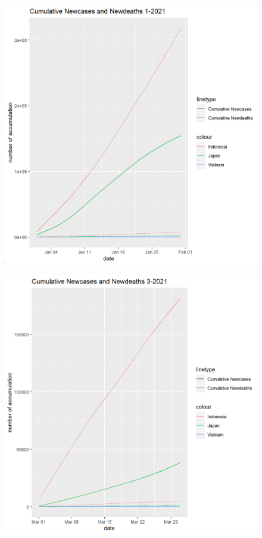 \documentclass[a4paper]{article}
\theoremstyle{definition}
\begin{document}
\begin{enumerate}[1)]
\begin{figure}[H]
\begin{center}
        \includegraphics[scale=0.4]{vi/cml_new_1_2021.png}
    \end{center}
    \end{figure}
    \begin{figure}[H]
    \begin{center}
        \includegraphics[scale=0.4]{vi/cml_new_3_2021.png}

\end{center}
\end{figure}
\end{enumerate}
\end{document}
